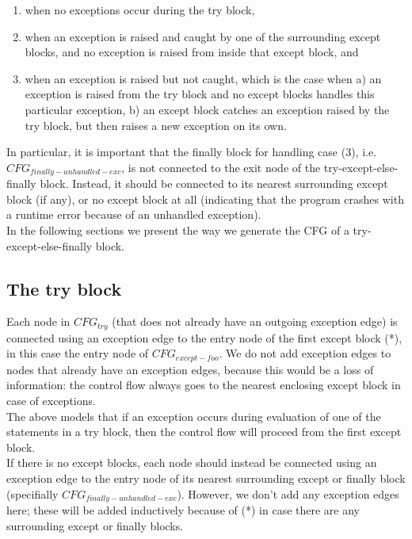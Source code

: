 \begin{enumerate}
  \item when no exceptions occur during the try block,
  \item when an exception is raised and caught by one of the surrounding except blocks, and no exception is raised from inside that except block, and
  \item when an exception is raised but not caught, which is the case when a) an exception is raised from
the try block and no except blocks handles this particular exception, b) an except block catches an exception raised by the try block, but then raises a new exception on its own.
\end{enumerate}

In particular, it is important that the finally block for handling case (3), i.e. $CFG_{finally-unhandled-exc}$, is not connected to the exit node of the try-except-else-finally block. Instead, it should be connected to its nearest surrounding except block (if any), or no except block at all (indicating that the program crashes with a runtime error because of an unhandled exception). \\
In the following sections we present the way we generate the CFG of a try-except-else-finally block.

\subsection{The try block}
Each node in $CFG_{try}$ (that does not already have an outgoing exception edge) is connected using an exception edge to the entry node of the first except block (*), in this case the entry node of $CFG_{except-foo}$. We do not add exception edges to nodes that already have an exception edges, because this would be a loss of information: the control flow always goes to the nearest enclosing except block in case of exceptions. \\
The above models that if an exception occurs during evaluation of one of the statements in a try block, then the control flow will proceed from the first except block. \\
If there is no except blocks, each node should instead be connected using an exception edge to the entry node of its nearest surrounding except or finally block (specifially $CFG_{finally-unhandled-exc}$). However, we don't add any exception edges here; these will be added inductively because of (*) in case there are any surrounding except or finally blocks.

